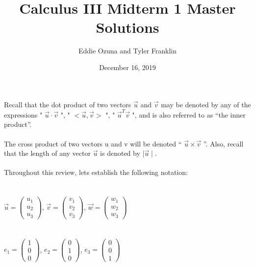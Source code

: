 \documentclass{article}
\title{Calculus III Midterm 1 Master Solutions}
\author{Eddie Ozuna and Tyler Franklin}
\date{December 16, 2019}
\begin{document}
\maketitle

Recall that the dot product of two vectors $\vec{u}$ and $\vec{v}$ may be denoted by any of
the expressions " $\vec{u}\cdot \vec{v}$ ", " $<\vec{u}, \vec{v}>$ ", " $\vec{u}^T \vec{v}$ ", and is also referred to as “the inner product”.
\\
\\
The cross product of two vectors u and v will be denoted “ $\vec{u}\times\vec{v}$ ”.
Also, recall that the length of any vector $\vec{u}$ is denoted by $\mid\vec{u}\mid$.
\\
\\
Throughout this review, lets establish the following notation:\\
\\
\\
$\vec{u}=\left(\!\begin{array}{c}u_{1} \\ u_{2} \\  u_{3}\end{array} \!\right)$,
$\vec{v}=\left(\!\begin{array}{c}v_{1} \\ v_{2} \\  v_{3}\end{array} \!\right)$,
$\vec{w}=\left(\!\begin{array}{c}w_{1} \\ w_{2} \\  w_{3}\end{array} \!\right)$
\\
\\
\\
$e_{1}=\left(\!\begin{array}{c}1 \\ 0 \\  0\end{array} \!\right)$,
$e_{2}=\left(\!\begin{array}{c}0 \\ 1 \\  0\end{array} \!\right)$,
$e_{3}=\left(\!\begin{array}{c}0 \\ 0 \\  1\end{array} \!\right)$
\\
\\
\\
\end{document}
